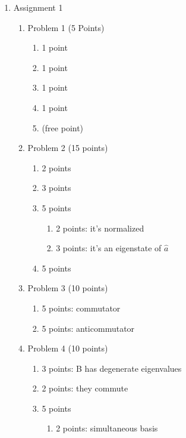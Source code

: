 \documentclass{article}
\begin{document}
\begin{enumerate}
   \item Assignment 1
      \begin{enumerate}
         \item Problem 1 (5 Points)
            \begin{enumerate}
               \item 1 point
               \item 1 point
               \item 1 point
               \item 1 point
               \item (free point)
            \end{enumerate}
         \item Problem 2 (15 points)
            \begin{enumerate}
               \item 2 points
               \item 3 points
               \item 5 points
                  \begin{enumerate}
                  \item 2 points: it's normalized
                  \item 3 points: it's an eigenstate of $ \hat{a} $
                  \end{enumerate}
               \item 5 points
            \end{enumerate}
         \item Problem 3 (10 points)
            \begin{enumerate}
               \item 5 points: commutator
               \item 5 points: anticommutator
            \end{enumerate}
         \item Problem 4 (10 points)
            \begin{enumerate}
               \item 3 points: B has degenerate eigenvalues
               \item 2 points: they commute
               \item 5 points
                  \begin{enumerate}
                     \item 2 points: simultaneous basis

\end{enumerate}
\end{enumerate}
\end{enumerate}
\end{enumerate}
\end{document}
